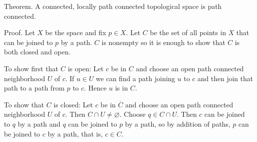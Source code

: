\documentclass[12pt]{article}
\begin{document}
Theorem. A connected, locally path connected topological space is path connected.

Proof. Let $X$ be the space and fix $p \in X$. Let $C$ be the set of all points in  
$X$ that can be joined to $p$ by a path. $C$ is nonempty so it is enough to show that $C$ is both closed and open. 

To show first that $C$ is open: Let $c$ be in $C$ and choose an open path connected neighborhood $U$ of $c$. If $u \in U$ we can find a path joining $u$ to $c$ and then join that path to a path from $p$ to $c$. Hence $u$ is in $C$.

To show that $C$ is closed: Let $c$ be in $\overline{C} $ and choose an open path connected neighborhood $U$ of $c$. Then $C \cap U \neq \varnothing$. Choose $q \in C \cap U$. Then $c$ can be joined to $q$ by a path and $q$  can be joined to $p$ by a path, so by addition of paths, $p$ can be joined to $c$ by a path, that is, $c \in C$.

\end{document}
